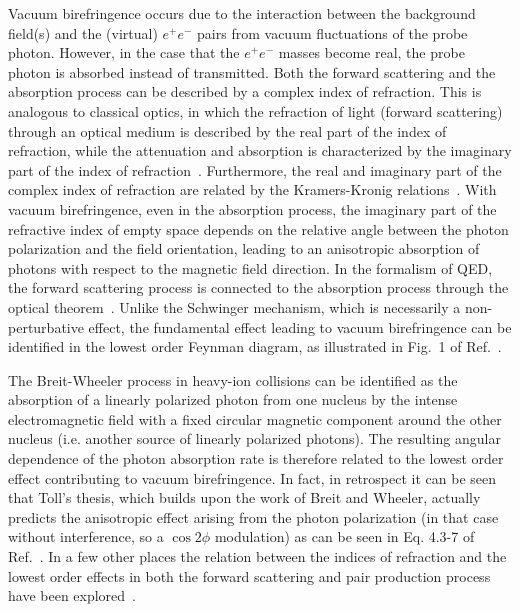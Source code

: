 \documentclass[twocolumn,epjc3]{svjour3}\sloppy
\begin{document}
Vacuum birefringence occurs due to the interaction between the background field(s) and the (virtual) $e^+e^-$ pairs from vacuum fluctuations of the probe photon. 
However, in the case that the $e^+e^-$ masses become real, the probe photon is absorbed instead of transmitted. 
Both the forward scattering and the absorption process can be described by a complex index of refraction.  
This is analogous to classical optics, in which the refraction of light (forward scattering) through an optical medium is described by the real part of the index of refraction, while the  attenuation and absorption is characterized by the imaginary part of the index of refraction~\cite{hechtOptics2015,jacksonClassicalElectrodynamics1975}. Furthermore, the real and imaginary part of the complex index of refraction are related by the Kramers-Kronig relations~\cite{kronigTheoryDispersionXRays1926,DISPERSIONRELATIONLIGHT}.
With vacuum birefringence, even in the absorption process, the imaginary part of the refractive index of empty space depends on the relative angle between the photon polarization and the field orientation, leading to an anisotropic absorption of photons with respect to the magnetic field direction.
In the formalism of QED, the forward scattering process is connected to the absorption process through the optical theorem~\cite{budnev_two-photon_1975}.
Unlike the Schwinger mechanism, which is necessarily a non-perturbative effect, the fundamental effect leading to vacuum birefringence can be identified in the lowest order Feynman diagram, as illustrated in Fig.~1 of Ref.~\cite{vallePVLASExperimentMeasuring2016}. 

The Breit-Wheeler process in heavy-ion collisions can be identified as the absorption of a linearly polarized photon from one nucleus by the intense electromagnetic field with a fixed circular magnetic component around the other nucleus (i.e. another source of linearly polarized photons). 
The resulting angular dependence of the photon absorption rate is therefore related to the lowest order effect contributing to vacuum birefringence\cite{hattoriVacuumBirefringenceStrong2013,Mignani:2016fwz}. 
In fact, in retrospect it can be seen that Toll's thesis, which builds upon the work of Breit and Wheeler, actually predicts the anisotropic effect arising from the photon polarization (in that case without interference, so a $\cos2\phi$ modulation) as can be seen in Eq. 4.3-7 of Ref.~\cite{DISPERSIONRELATIONLIGHT}. In a few other places the relation between the indices of refraction and the lowest order effects in both the forward scattering and pair production process have been explored~\cite{dinuVacuumRefractiveIndices2014,dinuPhotonPolarisationLightbylight2014}.
 
\end{document}
